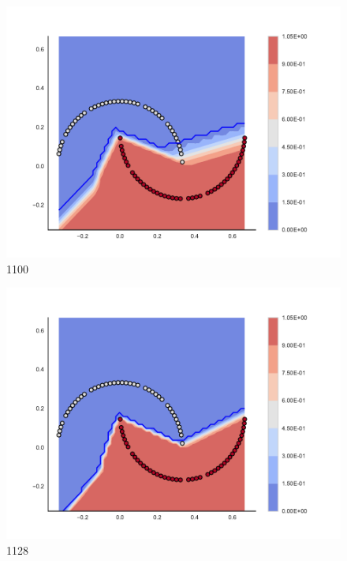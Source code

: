 \begin{subfigure}[b]{0.09\textwidth}
    \includegraphics[width=\textwidth]{img/convergence/1100.pdf}
    \caption{1100}
    \label{fig:convergence_1100}
\end{subfigure}
%
\begin{subfigure}[b]{0.09\textwidth}
    \includegraphics[width=\textwidth]{img/convergence/1128.pdf}
    \caption{1128}
    \label{fig:convergence_1128}
\end{subfigure}
%
